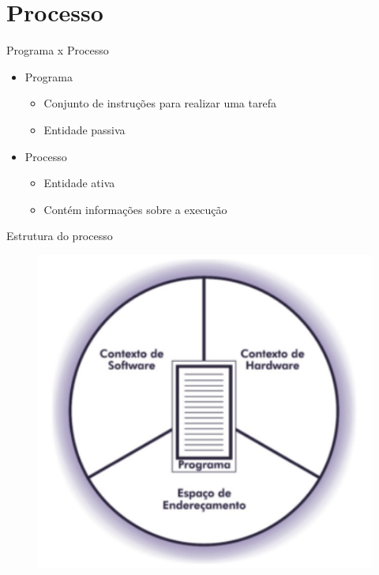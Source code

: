 \documentclass[aspectratio=169,
				xcolor=table]{beamer}
\begin{document}
	\section{Processo}	
	
	\begin{frame}{Programa x Processo}
		\begin{itemize}
			\item Programa
			\begin{itemize}
				\item Conjunto de instruções para realizar uma tarefa
				\item Entidade passiva
			\end{itemize}
			\vspace{1em}
			\item Processo
			\begin{itemize}
				\item Entidade ativa
				\item Contém informações sobre a execução
			\end{itemize}
		\end{itemize}
	\end{frame}	
	
	\begin{frame}{Estrutura do processo}	
		\begin{figure}[hbtp]
		\centering
		\includegraphics[keepaspectratio, height=.8\textheight]{../figs/cap03/estrutura.png}
		\end{figure}
	\end{frame}	
	
\end{document}
